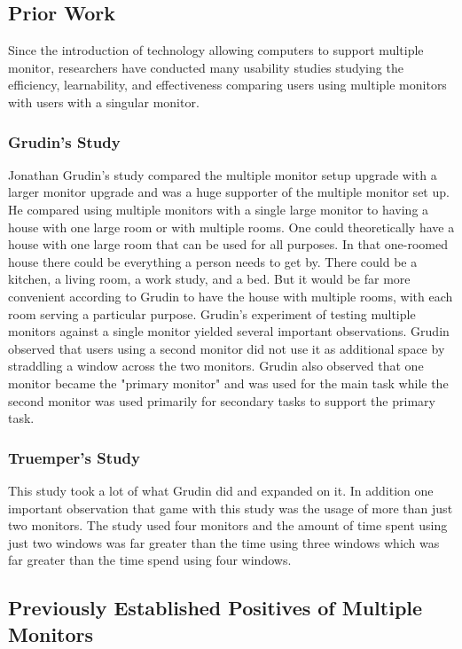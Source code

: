 \documentclass[a4paper]{article}
\begin{document}
\subsection{Prior Work}
Since the introduction of technology allowing computers to support multiple monitor, researchers have conducted many usability studies studying the efficiency, learnability, and effectiveness comparing users using multiple monitors with users with a singular monitor.

\subsubsection{Grudin's Study}
Jonathan Grudin's study compared the multiple monitor setup upgrade with a larger monitor upgrade and was a huge supporter of the multiple monitor set up. He compared using multiple monitors with a single large monitor to having a house with one large room or with multiple rooms. One could theoretically have a house with one large room that can be used for all purposes. In that one-roomed house there could be everything a person needs to get by. There could be a kitchen, a living room, a work study, and a bed. But it would be far more convenient according to Grudin to have the house with multiple rooms, with each room serving a particular purpose.\cite{Grudin} Grudin's experiment of testing multiple monitors against a single monitor yielded several important observations. Grudin observed that users using a second monitor did not use it as additional space by straddling a window across the two monitors.\cite{Grudin} Grudin also observed that one monitor became the "primary monitor" and was used for the main task while the second monitor was used primarily for secondary tasks to support the primary task.

\subsubsection{Truemper's Study}
This study took a lot of what Grudin did and expanded on it. In addition one important observation that game with this study was the usage of more than just two monitors. The study used four monitors and the amount of time spent using just two windows was far greater than the time using three windows which was far greater than the time spend using four windows.

\subsection{Previously Established Positives of Multiple Monitors}
\end{document}
